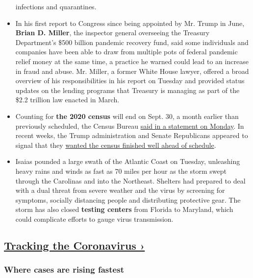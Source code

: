 \begin{itemize}
  infections and quarantines.
\item
  In his first report to Congress since being appointed by Mr. Trump in
  June, \textbf{Brian D. Miller}, the inspector general overseeing the
  Treasury Department's \$500 billion pandemic recovery fund, said some
  individuals and companies have been able to draw from multiple pots of
  federal pandemic relief money at the same time, a practice he warned
  could lead to an increase in fraud and abuse. Mr. Miller, a former
  White House lawyer, offered a broad overview of his responsibilities
  in his report on Tuesday and provided status updates on the lending
  programs that Treasury is managing as part of the \$2.2 trillion law
  enacted in March.
\item
  Counting for \textbf{the 2020 census} will end on Sept. 30, a month
  earlier than previously scheduled, the Census Bureau
  \href{https://www.census.gov/newsroom/press-releases/2020/delivering-complete-accurate-count.html}{said
  in a statement on Monday}. In recent weeks, the Trump administration
  and Senate Republicans appeared to signal that they
  \href{https://www.nytimes.com/2020/07/28/us/trump-census.html}{wanted
  the census finished well ahead of schedule}.
\item
  Isaias pounded a large swath of the Atlantic Coast on Tuesday,
  unleashing heavy rains and winds as fast as 70 miles per hour as the
  storm swept through the Carolinas and into the Northeast. Shelters had
  prepared to deal with a dual threat from severe weather and the virus
  by screening for symptoms, socially distancing people and distributing
  protective gear. The storm has also closed \textbf{testing centers}
  from Florida to Maryland, which could complicate efforts to gauge
  virus transmission.
\end{itemize}

\hypertarget{tracking-the-coronavirus-}{%
\subsection{\texorpdfstring{\href{https://www.nytimes.com/interactive/2020/us/coronavirus-us-cases.html}{Tracking
the Coronavirus
›}}{Tracking the Coronavirus ›}}\label{tracking-the-coronavirus-}}

\href{https://www.nytimes.com/interactive/2020/us/coronavirus-us-cases.html}{}

\hypertarget{where-cases-are-rising-fastest}{%
\subsubsection{\texorpdfstring{Where cases are \textbf{rising}
fastest}{Where cases are rising fastest}}\label{where-cases-are-rising-fastest}}

